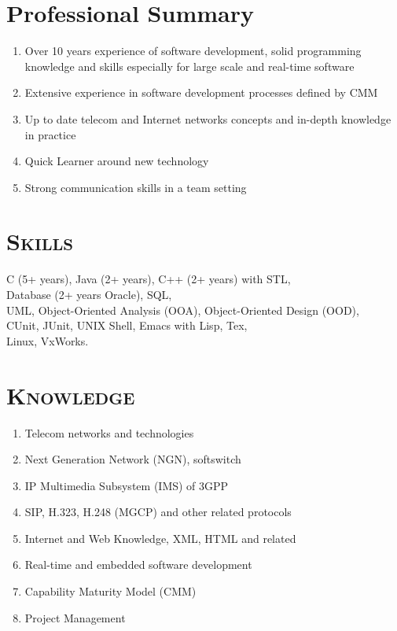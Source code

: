 \documentclass[margin,11pt]{res}
\begin{document}
\begin{resume}
 
\section{Professional Summary}

\begin{enumerate}
    \item Over 10 years experience of software development, solid programming knowledge and
      skills especially for large scale and real-time software
    \item Extensive experience in software development processes defined by CMM
    \item Up to date telecom and Internet networks concepts and in-depth knowledge in practice
    \item Quick Learner around new technology
    \item Strong communication skills in a team setting
\end{enumerate}

\section{\textsc{Skills}} 
   C (5+ years), Java (2+ years), C++ (2+ years) with STL,\\
   Database (2+ years Oracle), SQL,\\
   UML, Object-Oriented Analysis (OOA), Object-Oriented Design (OOD),\\
   CUnit, JUnit, UNIX Shell, Emacs with Lisp, Tex,\\
   Linux, VxWorks.

\section{\textsc{Knowledge}} 
\begin{enumerate}
    \item Telecom networks and technologies
    \item Next Generation Network (NGN), softswitch
    \item IP Multimedia Subsystem (IMS) of 3GPP
    \item SIP, H.323, H.248 (MGCP) and other related protocols
    \item Internet and Web Knowledge, XML, HTML and related
    \item Real-time and embedded software development
    \item Capability Maturity Model (CMM)
    \item Project Management
\end{enumerate}
 

\end{resume}
\end{document}

